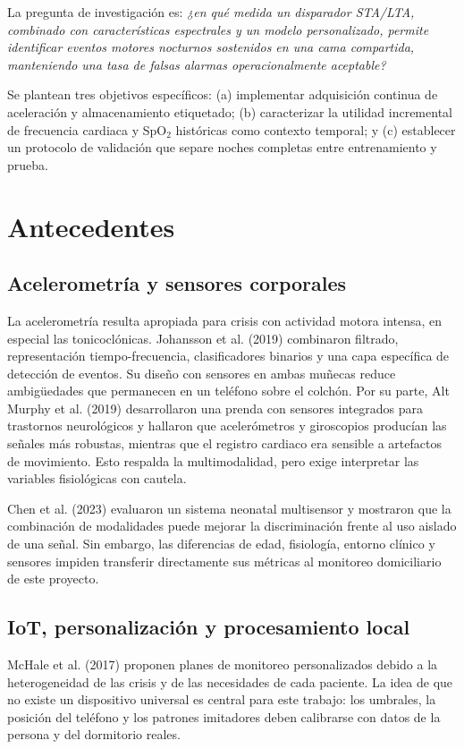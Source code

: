 \documentclass[12pt]{article}
\begin{document}
La pregunta de investigación es: \textit{¿en qué medida un disparador STA/LTA, combinado con características espectrales y un modelo personalizado, permite identificar eventos motores nocturnos sostenidos en una cama compartida, manteniendo una tasa de falsas alarmas operacionalmente aceptable?}

Se plantean tres objetivos específicos: (a) implementar adquisición continua de aceleración y almacenamiento etiquetado; (b) caracterizar la utilidad incremental de frecuencia cardiaca y SpO$_2$ históricas como contexto temporal; y (c) establecer un protocolo de validación que separe noches completas entre entrenamiento y prueba.

\section{Antecedentes}

\subsection{Acelerometría y sensores corporales}

La acelerometría resulta apropiada para crisis con actividad motora intensa, en especial las tonicoclónicas. Johansson et al. (2019) combinaron filtrado, representación tiempo-frecuencia, clasificadores binarios y una capa específica de detección de eventos. Su diseño con sensores en ambas muñecas reduce ambigüedades que permanecen en un teléfono sobre el colchón. Por su parte, Alt Murphy et al. (2019) desarrollaron una prenda con sensores integrados para trastornos neurológicos y hallaron que acelerómetros y giroscopios producían las señales más robustas, mientras que el registro cardiaco era sensible a artefactos de movimiento. Esto respalda la multimodalidad, pero exige interpretar las variables fisiológicas con cautela.

Chen et al. (2023) evaluaron un sistema neonatal multisensor y mostraron que la combinación de modalidades puede mejorar la discriminación frente al uso aislado de una señal. Sin embargo, las diferencias de edad, fisiología, entorno clínico y sensores impiden transferir directamente sus métricas al monitoreo domiciliario de este proyecto.

\subsection{IoT, personalización y procesamiento local}

McHale et al. (2017) proponen planes de monitoreo personalizados debido a la heterogeneidad de las crisis y de las necesidades de cada paciente. La idea de que no existe un dispositivo universal es central para este trabajo: los umbrales, la posición del teléfono y los patrones imitadores deben calibrarse con datos de la persona y del dormitorio reales.
\end{document}
